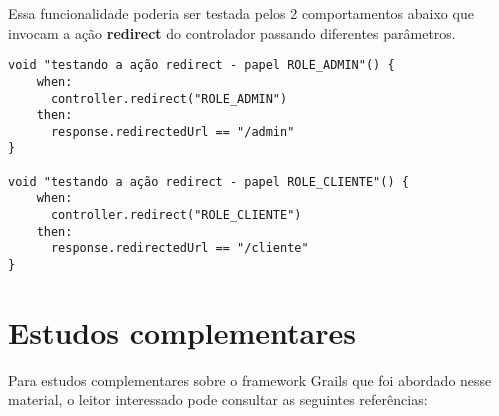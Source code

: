 \vspace{0.2cm}

Essa  funcionalidade  poderia ser  testada  pelos  2  comportamentos abaixo  que
invocam a ação {\bf redirect} do controlador passando diferentes parâmetros. 

\vspace{0.2cm}

\begin{mdframed}
\begin{footnotesize}
\begin{verbatim}
void "testando a ação redirect - papel ROLE_ADMIN"() {
    when:
      controller.redirect("ROLE_ADMIN")
    then:
      response.redirectedUrl == "/admin"
}

void "testando a ação redirect - papel ROLE_CLIENTE"() {
    when:
      controller.redirect("ROLE_CLIENTE")
    then:
      response.redirectedUrl == "/cliente"
}
\end{verbatim}
\end{footnotesize}
\end{mdframed}


\section{Estudos complementares}

\vspace{0.5cm}

Para  estudos complementares  sobre o  framework Grails  que foi  abordado nesse
material, o leitor interessado pode consultar as seguintes referências:

